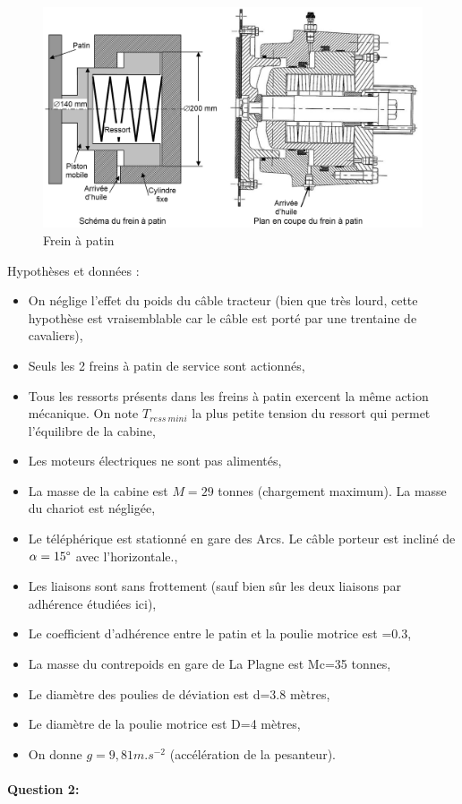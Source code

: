 \begin{figure}[!h]
\centering
\includegraphics[width=0.68\linewidth]{img/fig18}
\caption{Frein à patin}
\label{fig18}
\end{figure}

Hypothèses et données :
\begin{itemize}
 \item On néglige l'effet du poids du câble tracteur (bien que très lourd, cette hypothèse est vraisemblable car le câble est porté par une trentaine de cavaliers),
 \item Seuls les 2 freins à patin de service sont actionnés,
 \item Tous les ressorts présents dans les freins à patin exercent la même action mécanique. On note $T_{ress\ mini}$ la plus petite tension du ressort qui permet l'équilibre de la cabine,
 \item Les moteurs électriques ne sont pas alimentés,
 \item La masse de la cabine est $M=29$ tonnes (chargement maximum). La masse du chariot est négligée,
 \item Le téléphérique est stationné en gare des Arcs. Le câble porteur est incliné de $\alpha=15\degree$ avec l'horizontale.,
 \item Les liaisons sont sans frottement (sauf bien sûr les deux liaisons par adhérence étudiées ici),
 \item Le coefficient d'adhérence entre le patin et la poulie motrice est  =0.3,
 \item La masse du contrepoids en gare de La Plagne est Mc=35 tonnes,
 \item Le diamètre des poulies de déviation est d=3.8 mètres,
 \item Le diamètre de la poulie motrice est D=4 mètres,
 \item On donne $g=9,81 m.s^{-2}$ (accélération de la pesanteur).
\end{itemize}

\paragraph{Question 2:}

